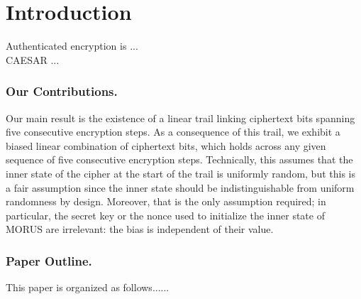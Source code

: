 \section{Introduction}
\label{sec/Introduction}

Authenticated encryption is ... \\

\noindent
CAESAR \cite{CAESAR} ...\\


\subsubsection*{Our Contributions.}
Our main result is the existence of a linear trail linking ciphertext bits spanning five consecutive encryption steps. As a consequence of this trail, we exhibit a biased linear combination of ciphertext bits, which holds across any given sequence of five consecutive encryption steps. Technically, this assumes that the inner state of the cipher at the start of the trail is uniformly random, but this is a fair assumption since the inner state should be indistinguishable from uniform randomness by design. Moreover, that is the only assumption required; in particular, the secret key or the nonce used to initialize the inner state of MORUS are irrelevant: the bias is independent of their value.



\subsubsection*{Paper Outline.}
This paper is organized as follows......